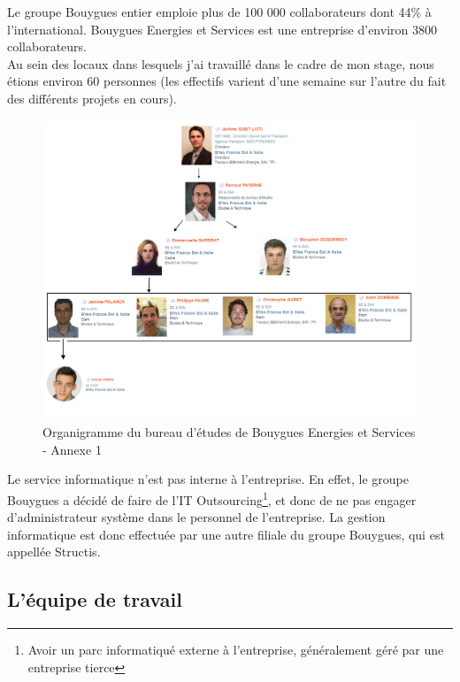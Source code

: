 \documentclass[a4paper]{article}
\begin{document}
    Le groupe Bouygues entier emploie plus de 100 000 collaborateurs dont 44\% à l’international. Bouygues Energies et Services est une entreprise d'environ 3800 collaborateurs. \\

    Au sein des locaux dans lesquels j'ai travaillé dans le cadre de mon stage, nous étions environ 60 personnes (les effectifs varient d'une semaine sur l'autre du fait des différents projets en cours).  \\

    \begin{figure}[H]
        \centering
        \includegraphics[scale=0.45]{img/Organigramme}
        \caption{Organigramme du bureau d'études de Bouygues Energies et Services - Annexe 1}
    \end{figure}

    Le service informatique n'est pas interne à l'entreprise. En effet, le groupe Bouygues a décidé de faire de l'IT Outsourcing\footnote{Avoir un parc informatiqué externe à l'entreprise, généralement géré par une entreprise tierce}, et donc de ne pas engager d'administrateur système dans le personnel de l'entreprise. La gestion informatique est donc effectuée par une autre filiale du groupe Bouygues, qui est appellée Structis. \\

    \subsection{L'équipe de travail}
\end{document}
